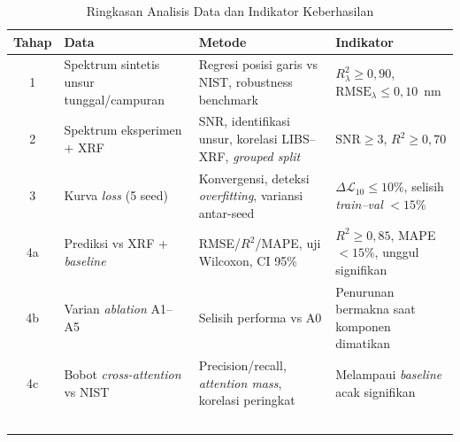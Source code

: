 \begin{table}[htbp]
\centering
\caption{Ringkasan Analisis Data dan Indikator Keberhasilan}
\label{tab:ai_analisis_data}
\small
\begin{tabularx}{\textwidth}{|c|X|X|X|}
\hline
\textbf{Tahap} & \textbf{Data} & \textbf{Metode} & \textbf{Indikator} \\ \hline
1 & Spektrum sintetis unsur tunggal/campuran & Regresi posisi garis vs NIST, robustness benchmark & $R^2_\lambda \geq 0{,}90$, $\mathrm{RMSE}_\lambda \leq 0{,}10$~nm \\ \hline
2 & Spektrum eksperimen + XRF & SNR, identifikasi unsur, korelasi LIBS--XRF, \textit{grouped split} & $\mathrm{SNR}\geq 3$, $R^2 \geq 0{,}70$ \\ \hline
3 & Kurva \textit{loss} (5 seed) & Konvergensi, deteksi \textit{overfitting}, variansi antar-seed & $\Delta\mathcal{L}_{10} \leq 10\%$, selisih \textit{train--val} ${<}15\%$ \\ \hline
4a & Prediksi vs XRF + \textit{baseline} & RMSE/$R^2$/MAPE, uji Wilcoxon, CI 95\% & $R^2 \geq 0{,}85$, MAPE ${<}15\%$, unggul signifikan \\ \hline
4b & Varian \textit{ablation} A1--A5 & Selisih performa vs A0 & Penurunan bermakna saat komponen dimatikan \\ \hline
4c & Bobot \textit{cross-attention} vs NIST & Precision/recall, \textit{attention mass}, korelasi peringkat & Melampaui \textit{baseline} acak signifikan \\ \hline\ \hline
\end{tabularx}
\end{table}
